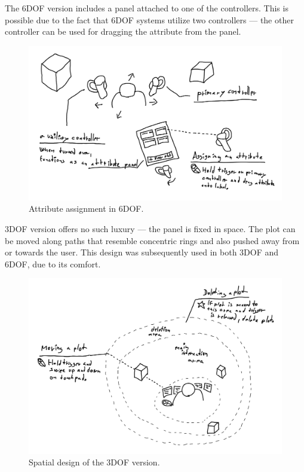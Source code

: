 \documentclass[thesis=M,english,hidelinks]{FITthesisXE}[2012/06/26]
\begin{document}
The 6DOF version includes a panel attached to one of the controllers. This is possible due to the fact that 6DOF systems utilize two controllers --- the other controller can be used for dragging the attribute from the panel.

\begin{figure}[ht]
\centering
\includegraphics[scale=0.85]{sketch_6dofpanel}
\caption{Attribute assignment in 6DOF.}
\label{fig:sketch_6dofpanel}
\end{figure}

3DOF version offers no such luxury --- the panel is fixed in space. The plot can be moved along paths that resemble concentric rings and also pushed away from or towards the user. This design was subsequently used in both 3DOF and 6DOF, due to its comfort.

\begin{figure}[ht]
\centering
\includegraphics[scale=0.85]{sketch_3dofspace}
\caption{Spatial design of the 3DOF version.}
\label{fig:sketch_3dofspace}
\end{figure}
\end{document}
